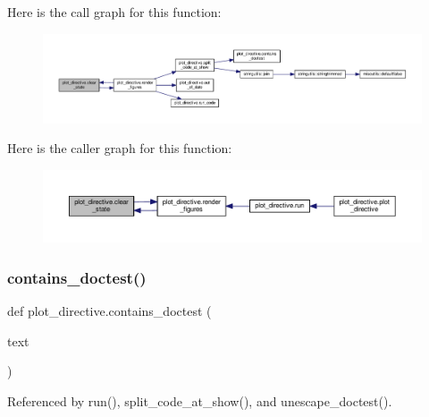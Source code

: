 Here is the call graph for this function\+:
\nopagebreak
\begin{figure}[H]
\begin{center}
\leavevmode
\includegraphics[width=350pt]{namespaceplot__directive_a7577e8f3efd148dc69bb0e39d030c103_cgraph}
\end{center}
\end{figure}
Here is the caller graph for this function\+:
\nopagebreak
\begin{figure}[H]
\begin{center}
\leavevmode
\includegraphics[width=350pt]{namespaceplot__directive_a7577e8f3efd148dc69bb0e39d030c103_icgraph}
\end{center}
\end{figure}
\mbox{\label{namespaceplot__directive_ac5b52bd431613c97ce90c1f63d8ddec6}} 
\subsubsection{\texorpdfstring{contains\+\_\+doctest()}{contains\_doctest()}}
{\footnotesize\ttfamily def plot\+\_\+directive.\+contains\+\_\+doctest (\begin{DoxyParamCaption}\item[{}]{text }\end{DoxyParamCaption})}



Referenced by run(), split\+\_\+code\+\_\+at\+\_\+show(), and unescape\+\_\+doctest().

